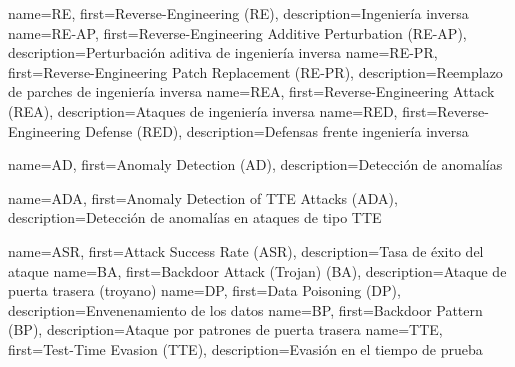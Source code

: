        {name={RE},     first={Reverse-Engineering (RE)},                           description={Ingeniería inversa}}
    {name={RE-AP},  first={Reverse-Engineering Additive Perturbation (RE-AP)},  description={Perturbación aditiva de ingeniería inversa}}
    {name={RE-PR},  first={Reverse-Engineering Patch Replacement (RE-PR)},      description={Reemplazo de parches de ingeniería inversa}}
      {name={REA},    first={Reverse-Engineering Attack (REA)},                   description={Ataques de ingeniería inversa}}
      {name={RED},    first={Reverse-Engineering Defense (RED)},                  description={Defensas frente ingeniería inversa}}



 {name={AD}, first={Anomaly Detection (AD)}, description={Detección de anomalías}}

 {name={ADA}, first={Anomaly Detection of TTE Attacks (ADA)}, description={Detección de anomalías en ataques de tipo TTE}}

  {name={ASR},    first={Attack Success Rate (ASR)}, description={Tasa de éxito del ataque}}
   {name={BA},     first={Backdoor Attack (Trojan) (BA)}, description={Ataque de puerta trasera (troyano)}}
   {name={DP},     first={Data Poisoning (DP)}, description={Envenenamiento de los datos}}
   {name={BP},     first={Backdoor Pattern (BP)}, description={Ataque por patrones de puerta trasera}}
  {name={TTE},    first={Test-Time Evasion (TTE)}, description={Evasión en el tiempo de prueba}}


